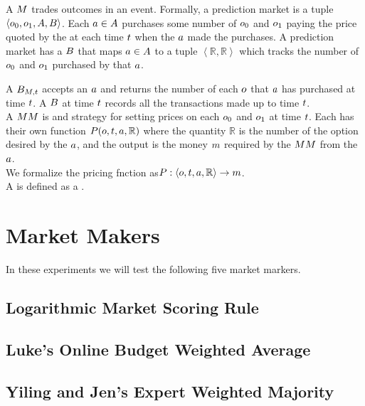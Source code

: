 A  $M$ trades outcomes in an event. Formally, a prediction market 
is a tuple $\left<o_0,o_1, A, B\right>$. Each  
$a\in A$ purchases some number of $o_0$ and $o_1$ paying the price 
quoted by the  at each time $t$ when the  $a$ 
made the purchases. A prediction market has a  $B$ that maps $a\in A$ to a tuple $\left<\mathbb{R},\mathbb{R}\right>$ which tracks the number of $o_0$ and $o_1$ 
purchased by that  $a$.

A  $B_{M,t}$ accepts an  $a$ and returns the number of 
each  $o$ that  $a$ has purchased at time $t$. A 
 $B$ at time $t$ records all the transactions made up to time $t$.\\

A  $MM$ is  and strategy for setting prices
on each  $o_0$ and $o_1$ at time $t$. Each  has
their own function $P(o,t,a,\mathbb{R})$ where the quantity $\mathbb{R}$ is the
number of the option desired by the  $a$, and the output is the money $m$
required by the  $MM$ from the  $a$. \\

We formalize the pricing fnction as$P:\left<o,t,a,\mathbb{R}\right> \rightarrow m$.\\

A  is defined as a .\\

\section{Market Makers}
In these experiments we will test the following five market markers.
\subsection{Logarithmic Market Scoring Rule}
\subsection{Luke's Online Budget Weighted Average}
\subsection{Yiling and Jen's Expert Weighted Majority}
